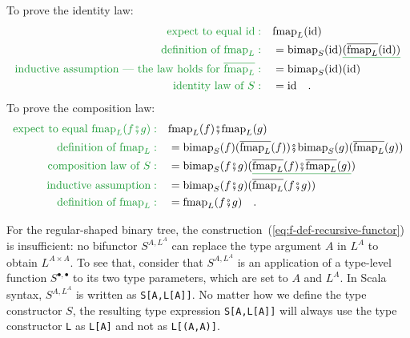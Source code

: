 To prove the identity law:
\begin{align*}
{\color{greenunder}\text{expect to equal }\text{id}:}\quad & \text{fmap}_{L}(\text{id})\\
{\color{greenunder}\text{definition of }\text{fmap}_{L}:}\quad & =\text{bimap}_{S}(\text{id})\gunderline{(\overline{\text{fmap}_{L}}(\text{id}))}\\
{\color{greenunder}\text{inductive assumption --- the law holds for }\overline{\text{fmap}_{L}}:}\quad & =\text{bimap}_{S}(\text{id})(\text{id})\\
{\color{greenunder}\text{identity law of }S:}\quad & =\text{id}\quad.
\end{align*}
To prove the composition law:
\begin{align*}
{\color{greenunder}\text{expect to equal }\text{fmap}_{L}(f\bef g):}\quad & \text{fmap}_{L}(f)\bef\text{fmap}_{L}(g)\\
{\color{greenunder}\text{definition of }\text{fmap}_{L}:}\quad & =\text{bimap}_{S}(f)(\overline{\text{fmap}_{L}}(f))\bef\text{bimap}_{S}(g)(\overline{\text{fmap}_{L}}(g))\\
{\color{greenunder}\text{composition law of }S:}\quad & =\text{bimap}_{S}(f\bef g)(\gunderline{\overline{\text{fmap}_{L}}(f)\bef\overline{\text{fmap}_{L}}(g)})\\
{\color{greenunder}\text{inductive assumption}:}\quad & =\text{bimap}_{S}(f\bef g)(\overline{\text{fmap}_{L}}(f\bef g))\\
{\color{greenunder}\text{definition of }\text{fmap}_{L}:}\quad & =\text{fmap}_{L}(f\bef g)\quad.
\end{align*}

For the regular-shaped binary tree, the construction~(\ref{eq:f-def-recursive-functor})
is insufficient: no bifunctor $S^{A,L^{A}}$ can replace the type
argument $A$ in $L^{A}$ to obtain $L^{A\times A}$. To see that,
consider that $S^{A,L^{A}}$ is an application of a type-level function
$S^{\bullet,\bullet}$ to its two type parameters, which are set to
$A$ and $L^{A}$. In Scala syntax, $S^{A,L^{A}}$ is written as \lstinline!S[A,L[A]]!.
No matter how we define the type constructor $S$, the resulting type
expression \lstinline!S[A,L[A]]! will always use the type constructor
\lstinline!L! as \lstinline!L[A]! and not as \lstinline!L[(A,A)]!. 


